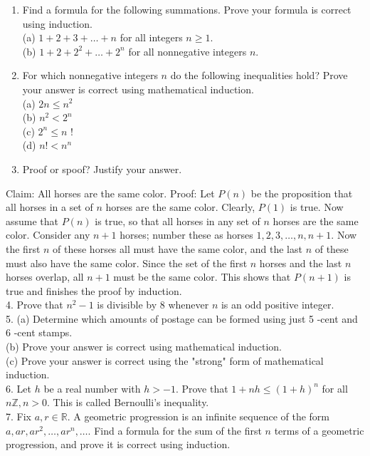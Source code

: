 \begin{enumerate}
  \item Find a formula for the following summations. Prove your formula is correct using induction.\\
(a) $1+2+3+\ldots+n$ for all integers $n \geq 1$.\\
(b) $1+2+2^{2}+\ldots+2^{n}$ for all nonnegative integers $n$.
  \item For which nonnegative integers $n$ do the following inequalities hold? Prove your answer is correct using mathematical induction.\\
(a) $2 n \leq n^{2}$\\
(b) $n^{2}<2^{n}$\\
(c) $2^{n} \leq n$ !\\
(d) $n!<n^{n}$
  \item Proof or spoof? Justify your answer.
\end{enumerate}

Claim: All horses are the same color. Proof: Let $P(n)$ be the proposition that all horses in a set of $n$ horses are the same color. Clearly, $P(1)$ is true. Now assume that $P(n)$ is true, so that all horses in any set of $n$ horses are the same color. Consider any $n+1$ horses; number these as horses $1,2,3, \ldots, n, n+1$. Now the first $n$ of these horses all must have the same color, and the last $n$ of these must also have the same color. Since the set of the first $n$ horses and the last $n$ horses overlap, all $n+1$ must be the same color. This shows that $P(n+1)$ is true and finishes the proof by induction.\\
4. Prove that $n^{2}-1$ is divisible by 8 whenever $n$ is an odd positive integer.\\
5. (a) Determine which amounts of postage can be formed using just 5 -cent and 6 -cent stamps.\\
(b) Prove your answer is correct using mathematical induction.\\
(c) Prove your answer is correct using the "strong" form of mathematical induction.\\
6. Let $h$ be a real number with $h>-1$. Prove that $1+n h \leq(1+h)^{n}$ for all $n \mathbb{Z}, n>0$. This is called Bernoulli's inequality.\\
7. Fix $a, r \in \mathbb{R}$. A geometric progression is an infinite sequence of the form $a, a r, a r^{2}, \ldots, a r^{n}, \ldots$. Find a formula for the sum of the first $n$ terms of a geometric progression, and prove it is correct using induction.

